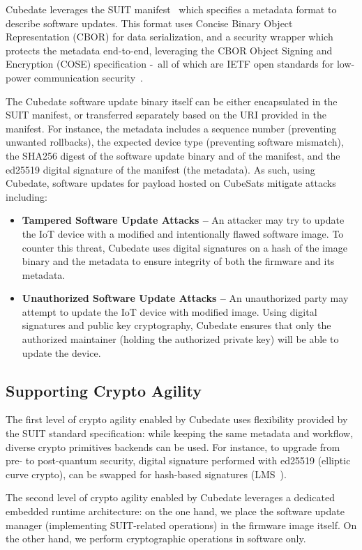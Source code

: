 Cubedate leverages the SUIT manifest~\cite{suit-manifest} which specifies a metadata
format to describe software updates. This format uses Concise Binary Object Representation
(CBOR) for data serialization, and a security wrapper which protects the metadata end-to-end,
leveraging the CBOR Object Signing and Encryption (COSE) specification -\ all of which are IETF
open standards for low-power communication security~\cite{tschofenig2019cyberphysical}.

The Cubedate software update binary itself can be either encapsulated in the SUIT manifest, or transferred
separately based on the URI provided in the manifest. For instance, the metadata includes a sequence number
(preventing unwanted rollbacks), the expected device type (preventing software mismatch), the SHA256 digest
of the software update binary and of the manifest, and the ed25519 digital signature of the manifest (the metadata).
As such, using Cubedate, software updates for payload hosted on CubeSats mitigate attacks including:

\begin{itemize}
\item {\bf Tampered Software Update Attacks –} An attacker may try to update the IoT device with a
modified and intentionally flawed software image. To counter this threat, Cubedate uses digital
signatures on a hash of the image binary and the metadata to ensure integrity of both the firmware
and its metadata.
\item {\bf Unauthorized Software Update Attacks –} An unauthorized party may attempt to update the IoT
device with modified image. Using digital signatures and public key cryptography, Cubedate ensures that
only the authorized maintainer (holding the authorized private key) will be able to update the device.
\end{itemize}

\subsection{Supporting Crypto Agility}
The first level of crypto agility enabled by Cubedate uses flexibility provided by the SUIT standard
specification: while keeping the same metadata and workflow, diverse crypto primitives backends can be
used. For instance, to upgrade from pre- to post-quantum security, digital signature performed with
ed25519 (elliptic curve crypto), can be swapped for hash-based signatures (LMS~\cite{banegas2022quantum-suit}).

The second level of crypto agility enabled by Cubedate leverages a dedicated embedded runtime architecture:
on the one hand, we place the software update manager (implementing SUIT-related operations) in the firmware image itself.
On the other hand, we perform cryptographic operations in software only.


